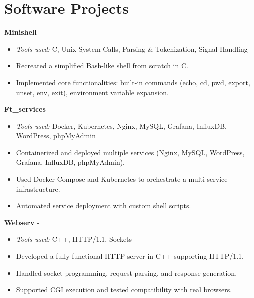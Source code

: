 \documentclass[a4paper,11pt]{article}%
\begin{document}
\section*{Software Projects}%
%
\noindent \textbf{Minishell} - \href{https://github.com/sboof911/minishell}{{}}%
\begin{itemize}[leftmargin=2em,label={},parsep=0pt,topsep=1em]%
\item \textit{Tools used:} C, Unix System Calls, Parsing \& Tokenization, Signal Handling%
\item Recreated a simplified Bash-like shell from scratch in C.%
\item Implemented core functionalities: built-in commands (echo, cd, pwd, export, unset, env, exit), environment variable expansion.%
\end{itemize}%
%
\noindent \textbf{Ft\_services} - \href{https://github.com/sboof911/ft_services}{{}}%
\begin{itemize}[leftmargin=2em,label={},parsep=0pt,topsep=1em]%
\item \textit{Tools used:} Docker, Kubernetes, Nginx, MySQL, Grafana, InfluxDB, WordPress, phpMyAdmin%
\item Containerized and deployed multiple services (Nginx, MySQL, WordPress, Grafana, InfluxDB, phpMyAdmin).%
\item Used Docker Compose and Kubernetes to orchestrate a multi-service infrastructure.%
\item Automated service deployment with custom shell scripts.%
\end{itemize}%
%
\noindent \textbf{Webserv} - \href{https://github.com/sboof911/webserv}{{}}%
\begin{itemize}[leftmargin=2em,label={},parsep=0pt,topsep=1em]%
\item \textit{Tools used:} C++, HTTP/1.1, Sockets%
\item Developed a fully functional HTTP server in C++ supporting HTTP/1.1.%
\item Handled socket programming, request parsing, and response generation.%
\item Supported CGI execution and tested compatibility with real browsers.%
\end{itemize}%
\end{document}
